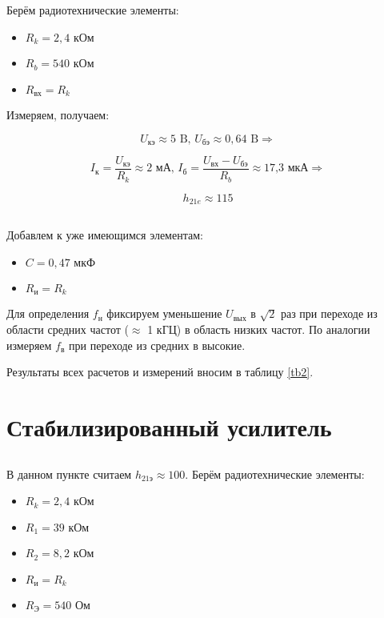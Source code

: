 \documentclass[15pt,a5paper,reqno]{article}
\begin{document}
Берём радиотехнические элементы:

\begin{itemize}
  \item $R_k = 2,4 \text{ кОм}$
  \item $R_b = 540 \text{ кОм}$
  \item $R_{вх} = R_k$
\end{itemize}

Измеряем, получаем: 

\[ U_{кэ} \approx 5 \text{ B, } U_{бэ} \approx 0,64 \text{ B} \Rightarrow  \]

\[ I_{к} = \frac{U_{кэ}}{R_k} \approx 2 \text{ мА, } I_{б} = \frac{U_{вх} - U_{бэ}}{R_b} \approx  \text{17,3 мкА} \Rightarrow  \]

\[ h_{21e} \approx 115 \]

\subsection{}

Добавлем к уже имеющимся элементам:

\begin{itemize}

  \item $C = 0,47 \text{ мкФ}$
  \item $R_{и} = R_k$
\end{itemize}

Для определения $f_н$ фиксируем уменьшение $U_{вых}$ в $\sqrt{2}$ раз при переходе из области средних частот ($\approx$ 1 кГЦ) в область низких частот.
По аналогии измеряем $f_в$ при переходе из средних в высокие.
 
Результаты всех расчетов и измерений вносим в таблицу \ref{tb2}.

\section{Стабилизированный усилитель}

\subsection{}

В данном пункте считаем $h_{21э} \approx 100$. Берём радиотехнические элементы:

\begin{itemize}
  \item $R_k = 2,4 \text{ кОм}$
  \item $R_1 = 39 \text{ кОм}$
  \item $R_2 = 8,2 \text{ кОм}$
  \item $R_{и} = R_k$
  \item $R_Э = 540 \text{ Ом}$
\end{itemize}
\end{document}
